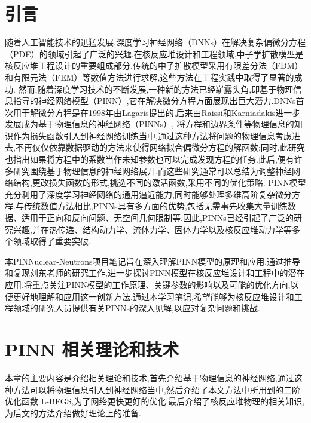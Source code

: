 \documentclass{Sichuan Normal University}
\begin{document}


\maketitle
\tableofcontents  %
\section*{引言}
随着人工智能技术的迅猛发展,深度学习神经网络（DNNs）在解决复杂偏微分方程（PDE）的领域引起了广泛的兴趣.在核反应堆设计和工程领域,中子学扩散模型是核反应堆工程设计的重要组成部分.传统的中子扩散模型采用有限差分法（FDM）和有限元法（FEM）等数值方法进行求解,这些方法在工程实践中取得了显著的成功.
然而,随着深度学习技术的不断发展,一种新的方法已经崭露头角,即基于物理信息指导的神经网络模型（PINN）,它在解决微分方程方面展现出巨大潜力.DNNs首次用于解微分方程是在1998年由Lagaris提出的\cite{lagarisArtificialNeuralNetworks1998},后来由Raissi和Karniadakis进一步发展成为基于物理信息的神经网络（PINNs）\cite{raissiPhysicsinformedNeuralNetworks2019},
将方程和边界条件等物理信息的知识作为损失函数引入到神经网络训练当中,通过这种方法将问题的物理信息考虑进去,不再仅仅依靠数据驱动的方法来使得网络拟合偏微分方程的解函数;同时,此研究也指出如果将方程中的系数当作未知参数也可以完成发现方程的任务.此后,便有许多研究围绕基于物理信息的神经网络展开,而这些研究通常可以总结为调整神经网络结构,更改损失函数的形式,挑选不同的激活函数,采用不同的优化策略.
PINN模型充分利用了深度学习神经网络的通用逼近能力,同时能够处理多维高阶复杂微分方程.与传统数值方法相比,PINNs具有多方面的优势,包括无需事先收集大量训练数据、适用于正向和反向问题、无空间几何限制等.因此,PINNs已经引起了广泛的研究兴趣,并在热传递、结构动力学、流体力学、固体力学以及核反应堆动力学等多个领域取得了重要突破.

本PINNuclear-Neutrons项目笔记旨在深入理解PINN模型的原理和应用,通过推导和复现刘东老师的研究工作\cite{LiuDongJiYuPINNShenDuJiQiXueXiJiShuQiuJieDuoWeiZhongZiXueKuoSanFangCheng2022},进一步探讨PINN模型在核反应堆设计和工程中的潜在应用.将重点关注PINN模型的工作原理、关键参数的影响以及可能的优化方向,以便更好地理解和应用这一创新方法.通过本学习笔记,希望能够为核反应堆设计和工程领域的研究人员提供有关PINNs的深入见解,以应对复杂问题和挑战.


\section{PINN 相关理论和技术}
本章的主要内容是介绍相关理论和技术,首先介绍基于物理信息的神经网络,通过这种方法可以将物理信息引入到神经网络当中,然后介绍了本文方法中所用到的二阶优化函数 L-BFGS,为了网络更快更好的优化.最后介绍了核反应堆物理的相关知识,为后文的方法介绍做好理论上的准备.
\end{document}
